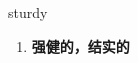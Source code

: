
\begin{frame}
{\huge sturdy}
\begin{center}
\begin{enumerate}\Large
  \item \textbf{强健的，结实的}
\end{enumerate}
\end{center}
\end{frame}
